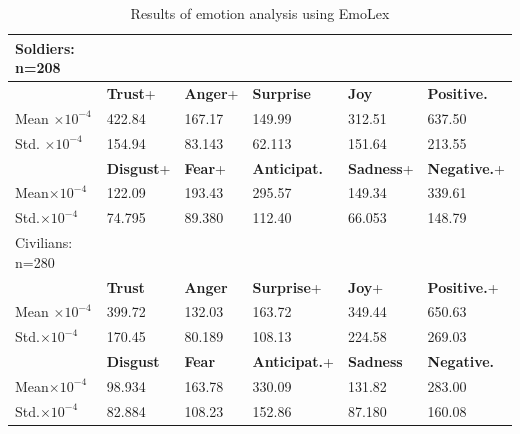 \begin{table}[h]
  \caption{Results of emotion analysis using EmoLex}
  \label{table:emolexResult}
  \centering
  \renewcommand{\tabularxcolumn}{m} %
  \begin{tabularx}{\textwidth}{l l l l l l}
    \toprule
    Soldiers: n=208
    \tabularnewline \midrule
     & \textbf{Trust}+   & \textbf{Anger}+ & \textbf{Surprise}    & \textbf{Joy}      & \textbf{Positive.}
    \tabularnewline \midrule
    Mean $\times 10^{-4}$
     & 422.84            & 167.17          & 149.99               & 312.51            & 637.50
    \tabularnewline
    Std. $\times 10^{-4}$
     & 154.94            & 83.143          & 62.113               & 151.64            & 213.55
    \tabularnewline \midrule
     & \textbf{Disgust}+ & \textbf{Fear}+  & \textbf{Anticipat.}  & \textbf{Sadness}+ & \textbf{Negative.}+
    \tabularnewline \midrule
    Mean$\times 10^{-4}$
     & 122.09            & 193.43          & 295.57               & 149.34            & 339.61
    \tabularnewline
    Std.$\times 10^{-4}$
     & 74.795            & 89.380          & 112.40               & 66.053            & 148.79
    \tabularnewline \hline \hline
    Civilians: n=280
    \tabularnewline \midrule
     & \textbf{Trust}    & \textbf{Anger}  & \textbf{Surprise}+   & \textbf{Joy}+     & \textbf{Positive.}+
    \tabularnewline \midrule
    Mean $\times 10^{-4}$
     & 399.72            & 132.03          & 163.72               & 349.44            & 650.63
    \tabularnewline
    Std.$\times 10^{-4}$
     & 170.45            & 80.189          & 108.13               & 224.58            & 269.03
    \tabularnewline \midrule
     & \textbf{Disgust}  & \textbf{Fear}   & \textbf{Anticipat.}+ & \textbf{Sadness}  & \textbf{Negative.}
    \tabularnewline \midrule
    Mean$\times 10^{-4}$
     & 98.934            & 163.78          & 330.09               & 131.82            & 283.00
    \tabularnewline
    Std.$\times 10^{-4}$
     & 82.884            & 108.23          & 152.86               & 87.180            & 160.08
    \tabularnewline \bottomrule
  \end{tabularx}
\end{table}


